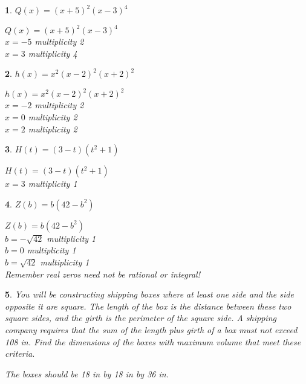 \documentclass{amsbook}
\newtheorem{exc}{}
\newenvironment{ex}{\begin{exc}\normalfont}{\end{exc}}
\numberwithin{section}{chapter}
\numberwithin{equation}{chapter}
\begin{document}
\begin{multicols}{2}
\begin{ex}
	$Q(x) = (x + 5)^{2}(x - 3)^{4}$
	\begin{sol}
	$Q(x) = (x + 5)^{2}(x - 3)^{4}$\\
	$x = -5$ multiplicity 2\\
	$x = 3$ multiplicity 4	
	\end{sol}
\end{ex}

\begin{ex}
	$h(x) = x^2(x-2)^2(x+2)^2$
	\begin{sol}
		$h(x) = x^2(x-2)^2(x+2)^2$\\
		$x = -2$ multiplicity 2\\
		$x = 0$ multiplicity 2\\
		$x = 2$ multiplicity 2
	\end{sol}
\end{ex}

\begin{ex}
	$H(t) = (3-t)(t^2+1)$
	\begin{sol}
		$H(t) = (3-t)\left(t^2+1\right)$\\
		$x =3$ multiplicity 1
	\end{sol}
\end{ex}

\begin{ex}
	$Z(b) = b(42 - b^{2})$ 
	\begin{sol}
	$Z(b) = b(42 - b^{2})$\\
	$b = -\sqrt{42}$ multiplicity 1\\
	$b = 0$ multiplicity 1\\
	$b = \sqrt{42}$ multiplicity 1\\
	Remember real zeros need not be rational or integral!
	\end{sol}
\end{ex}

\end{multicols}

\begin{ex}
	 You will be constructing shipping boxes where at least one side and the side opposite it are square. The length of the box is the distance between these two square sides, and the girth is the perimeter of the square side. A shipping company requires that the sum of the length plus girth of a box must not exceed 108 in. Find the dimensions of the boxes with maximum volume that meet these criteria.\begin{sol}
	 The boxes should be 18 in by 18 in by 36 in.
	 \end{sol}
\end{ex}
\end{document}
